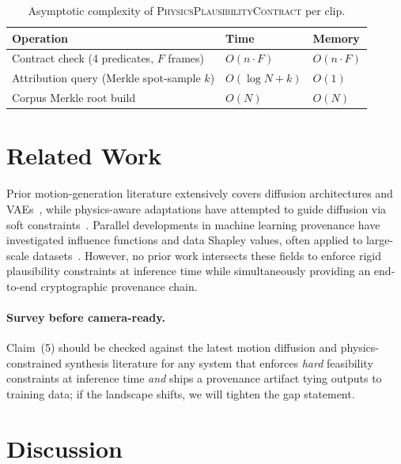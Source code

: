 \documentclass[sigconf,nonacm]{acmart}
\newcommand{\plausibility}{\textsc{PhysicsPlausibilityContract}}
\begin{document}
\begin{table}[t]
  \centering
  \caption{Asymptotic complexity of \plausibility{} per clip.}
  \label{tab:complexity}
  \footnotesize
  \begin{tabular}{@{}lll@{}}
    \toprule
    \textbf{Operation} & \textbf{Time} & \textbf{Memory} \\
    \midrule
    Contract check (4 predicates, $F$ frames) & $O(n \cdot F)$ & $O(n \cdot F)$ \\
    Attribution query (Merkle spot-sample $k$) & $O(\log N + k)$ & $O(1)$ \\
    Corpus Merkle root build & $O(N)$ & $O(N)$ \\
    \bottomrule
  \end{tabular}
\end{table}

\section{Related Work}
\label{sec:related}

Prior motion-generation literature extensively covers diffusion architectures and VAEs~\cite{animgan, motionvae, motiondiffuse, mdm}, while physics-aware adaptations have attempted to guide diffusion via soft constraints~\cite{physdiff}. Parallel developments in machine learning provenance have investigated influence functions and data Shapley values, often applied to large-scale datasets~\cite{humanml3d, amass, motion-x}. However, no prior work intersects these fields to enforce rigid plausibility constraints at inference time while simultaneously providing an end-to-end cryptographic provenance chain. %

\paragraph{Survey before camera-ready.}
Claim~(5) should be checked against the latest motion diffusion and
physics-constrained synthesis literature for any system that
enforces \emph{hard} feasibility constraints at inference time
\emph{and} ships a provenance artifact tying outputs to training
data; if the landscape shifts, we will tighten the gap statement.

\section{Discussion}
\label{sec:discussion}
\end{document}
